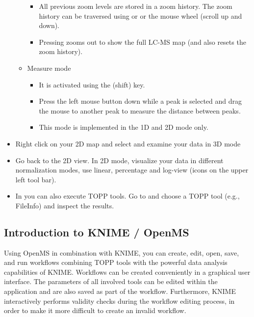 \begin{itemize}
\begin{itemize}
\begin{itemize}
        \item All previous zoom levels are stored in a zoom history. The zoom history can be traversed using
              \keys[,]{\ctrl,+} or \keys[,]{\ctrl,-} or the mouse wheel (scroll up and down).
        \item Pressing  zooms out to show the full LC-MS map (and also resets the zoom history).
        \end{itemize}
    \item Measure mode
        \begin{itemize}
        \item It is activated using the \keys{\shift} (shift) key.
        \item Press the left mouse button down while a peak is selected and drag the mouse to
        			another peak to measure the distance between peaks.
        \item This mode is implemented in the 1D and 2D mode only.
        \end{itemize}
    \end{itemize}
\item Right click on your 2D map and select  and examine your
			data in 3D mode
\item Go back to the 2D view. In 2D mode, visualize your data in different normalization modes, use linear, percentage and log-view (icons on the upper left tool bar).
\item In  you can also execute TOPP tools. Go to
			 and choose a TOPP tool (e.g., FileInfo) and
			inspect the results.
\end{itemize}


\subsection{Introduction to KNIME / OpenMS}
\label{KNIME_Intro}

Using OpenMS in combination with KNIME, you can create, edit, open, save, and run workflows
combining TOPP tools with the powerful data analysis capabilities of KNIME. Workflows can
be created conveniently in a graphical user interface. The parameters of all involved
tools can be edited within the application and are also saved as part of the workflow.
Furthermore, KNIME interactively performs validity checks during the workflow editing
process, in order to make it more difficult to create an invalid workflow.

